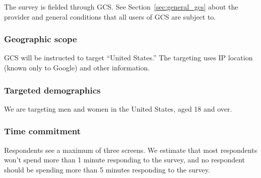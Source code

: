The survey is fielded through \ac{GCS}. See Section~\ref{sec:general_gcs} about the provider and general conditions that all users of \ac{GCS} are subject to.

\subsubsection{Geographic scope}
\ac{GCS} will be instructed to target ``United States.'' The targeting uses IP location (known only to Google) and other information. 

\subsubsection{Targeted demographics}
We are targeting men and women in the United States, aged 18 and over. 

\subsubsection{Time commitment}
Respondents see a maximum of three screens. We estimate that most respondents won't spend more than 1 minute responding to the survey, and no respondent should be spending more than 5 minutes responding to the survey.